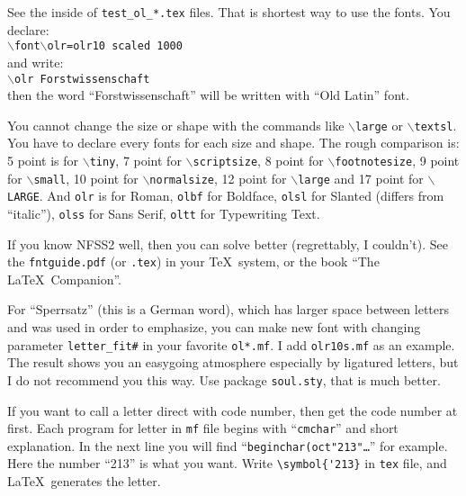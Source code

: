\documentclass[a4paper]{article}
\begin{document}
See the inside of \texttt{test\_ol\_*.tex} files.
That is shortest way to use the fonts.
You declare:\\
\texttt{{$\backslash$}font{$\backslash$}olr=olr10 scaled 1000}\\
and write:\\
\texttt{{$\backslash$}olr Forstwissenschaft}\\
then the word ``Forstwissenschaft'' will be written with ``Old Latin'' font.

You cannot change the size or shape with the commands
like \texttt{{$\backslash$}large} or \texttt{{$\backslash$}textsl}.
You have to declare every fonts for each size and shape.
The rough comparison is:
5 point is for \texttt{$\backslash$tiny},
7 point for \texttt{$\backslash$scriptsize},
8 point for \texttt{$\backslash$footnotesize},
9 point for \texttt{$\backslash$small},
10 point for \texttt{$\backslash$normalsize},
12 point for \texttt{$\backslash$large} and
17 point for \texttt{$\backslash$LARGE}.
And \texttt{olr} is for Roman,
\texttt{olbf} for Boldface,
\texttt{olsl} for Slanted (differs from ``italic''),
\texttt{olss} for Sans Serif,
\texttt{oltt} for Typewriting Text.

If you know NFSS2 well, then you can solve better
(regrettably, I couldn't).
See the \texttt{fntguide.pdf} (or \texttt{.tex}) in your \TeX\ system,
or the book ``The \LaTeX\ Companion''.

For ``Sperrsatz'' (this is a German word),
which has larger space between letters and
was used in order to emphasize,
you can make new font
with changing parameter \texttt{letter\_fit\#}
in your favorite \texttt{ol*.mf}.
I add \texttt{olr10s.mf} as an example.
The result shows you an easygoing atmosphere
especially by ligatured letters,
but I do not recommend you this way.
Use package \texttt{soul.sty}, that is much better.

If you want to call a letter direct with code number,
then get the code number at first.
Each program for letter in \texttt{mf} file
begins with ``\texttt{cmchar}'' and short explanation.
In the next line you will find ``\texttt{beginchar(oct"213"\ldots}''
for example.
Here the number ``213'' is what you want.
Write \verb|\symbol{'213}| in \texttt{tex} file,
and \LaTeX\ generates the letter.
\end{document}
